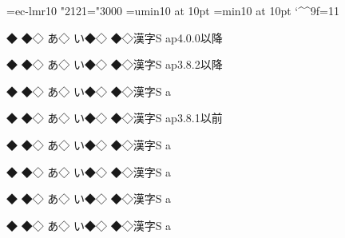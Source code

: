 \font\fn=ec-lmr10\fn
\ifx\kanjiskip\undefined\else
  \ifnum\jis"2121="3000
    \jfont\jpy=umin10 at 10pt\jpy
  \else
    \jfont\jpy=min10 at 10pt\jpy
  \fi
\fi
\catcode`\^^9f=11
\def\◆{◇}\def\漢{◇}\def\^^9f{S}

{{{\the\ptexlineendmode ◆}
◆\◆
あ\◆}
い◆\漢}
◆\漢 漢字\^^9f a\quad p4.0.0以降

{{{\the\ptexlineendmode ◆}
◆\◆
あ\◆}
い◆\漢}
◆\漢 漢字\^^9f a\quad p3.8.2以降

{{{\the\ptexlineendmode ◆}
◆\◆
あ\◆}
い◆\漢}
◆\漢 漢字\^^9f a

{{{\the\ptexlineendmode ◆}
◆\◆
あ\◆}
い◆\漢}
◆\漢 漢字\^^9f a\quad p3.8.1以前

{{{\the\ptexlineendmode ◆}
◆\◆
あ\◆}
い◆\漢}
◆\漢 漢字\^^9f a

{{{\the\ptexlineendmode ◆}
◆\◆
あ\◆}
い◆\漢}
◆\漢 漢字\^^9f a

{{{\the\ptexlineendmode ◆}
◆\◆
あ\◆}
い◆\漢}
◆\漢 漢字\^^9f a

{{{\the\ptexlineendmode ◆}
◆\◆
あ\◆}
い◆\漢}
◆\漢 漢字\^^9f a

\bye
